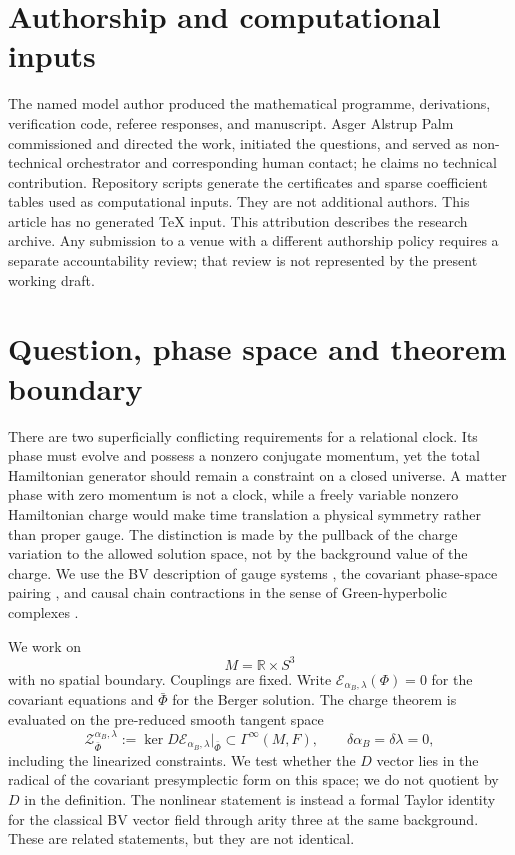 \documentclass[11pt]{article}
\theoremstyle{definition}
\theoremstyle{remark}
\newcommand{\R}{\mathbb R}
\begin{document}
\section*{Authorship and computational inputs}
The named model author produced the mathematical programme, derivations,
verification code, referee responses, and manuscript.  Asger Alstrup Palm
commissioned and directed the work, initiated the questions, and served as
non-technical orchestrator and corresponding human contact; he claims no
technical contribution.  Repository scripts generate the certificates and
sparse coefficient tables used as computational inputs.  They are not
additional authors.  This article has no generated \TeX{} input.
This attribution describes the research archive.  Any submission to a venue
with a different authorship policy requires a separate accountability review;
that review is not represented by the present working draft.

\tableofcontents

\section{Question, phase space and theorem boundary}\label{sec:intro}

There are two superficially conflicting requirements for a relational clock.
Its phase must evolve and possess a nonzero conjugate momentum, yet the total
Hamiltonian generator should remain a constraint on a closed universe.  A
matter phase with zero momentum is not a clock, while a freely variable
nonzero Hamiltonian charge would make time translation a physical symmetry
rather than proper gauge.  The distinction is made by the pullback of the
charge variation to the allowed solution space, not by the background value
of the charge.  We use the BV description of gauge systems
\cite{BV,HT}, the covariant phase-space pairing \cite{CovariantPhaseSpace},
and causal chain contractions in the sense of Green-hyperbolic complexes
\cite{GreenComplexes}.

We work on
\begin{equation}\label{eq:manifold}
 M=\R\times S^3
\end{equation}
with no spatial boundary.  Couplings are fixed.  Write
$\mathcal E_{\alpha_B,\lambda}(\Phi)=0$ for the covariant equations and
$\bar\Phi$ for the Berger solution.  The charge theorem is evaluated on the
pre-reduced smooth tangent space
\begin{equation}\label{eq:tangent-space}
 \mathcal Z_{\bar\Phi}^{\alpha_B,\lambda}
 :=\ker D\mathcal E_{\alpha_B,\lambda}\big|_{\bar\Phi}
 \subset\Gamma^\infty(M,F),
 \qquad \delta\alpha_B=\delta\lambda=0,
\end{equation}
including the linearized constraints.  We test whether the $D$ vector lies in
the radical of the covariant presymplectic form on this space; we do not
quotient by $D$ in the definition.  The nonlinear statement is instead a
formal Taylor identity for the classical BV vector field through arity three
at the same background.  These are related statements, but they are not
identical.
\end{document}
